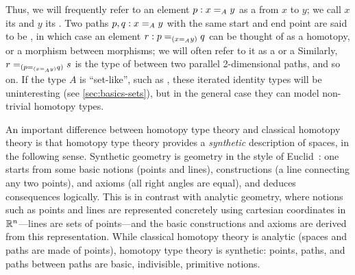 Thus, we will frequently refer to an element $p : \id[A]{x}{y}$ as
a 
from $x$ to $y$; we call $x$ its 
and $y$ its .
Two paths $p,q : \id[A]{x}{y}$ with the same start and end point are said to be ,
in which case an element $r : \id[{(\id[A]{x}{y})}]{p}{q}$ can
be thought of as a homotopy, or a morphism between morphisms;
we will often refer to it as a 
%
or a 
%
%
Similarly, $\id[{(\id[{(\id[A]{x}{y})}]{p}{q})}]{r}{s}$ is the type of
%
between two parallel 2-dimensional paths, and so on.  If the
type $A$ is ``set-like'', such as \nat, these iterated identity types
will be uninteresting (see \autoref{sec:basics-sets}), but in the
general case they can model non-trivial homotopy types.


An important difference between homotopy type theory and classical homotopy theory is that homotopy type theory provides a \emph{synthetic}
%
%
%
description of spaces, in the following sense. Synthetic geometry is geometry in the style of Euclid~\cite{Euclid}: one starts from some basic notions (points and lines), constructions (a line connecting any two points), and axioms
(all right angles are equal), and deduces consequences logically.  This is in contrast with analytic
%
geometry, where notions such as points and lines are represented concretely using cartesian coordinates in $\R^n$---lines are sets of points---and the basic constructions and axioms are derived from this representation.  While classical homotopy theory is analytic (spaces and paths are made of points), homotopy type theory is synthetic: points, paths, and paths between paths are basic, indivisible, primitive notions.

